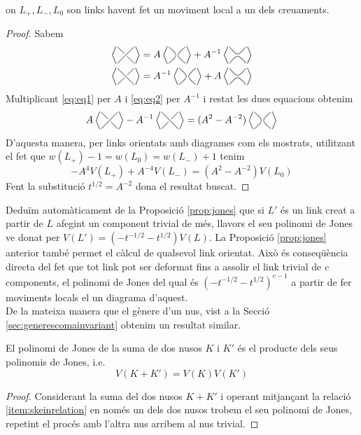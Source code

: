 on $L_{+}, L_{-}, L_{0}$ son links havent fet un moviment local a un dels creuaments.

\begin{proof}
	Sabem
	\begin{align}
		\label{eq:eq1}\left\langle\KPB\right\rangle=
		A\left\langle\KPC\right\rangle + A^{-1} \left\langle \KPD \right\rangle\\
		\label{eq:eq2}\left\langle\KPI\right\rangle=
		A^{-1}\left\langle\KPC\right\rangle + A \left\langle \KPD \right\rangle
	\end{align}
	Multiplicant \ref{eq:eq1} per $A$ i \ref{eq:eq2} per $A^{-1}$ i restat les dues equacions obtenim $$A\left\langle\KPB\right\rangle-A^{-1}\left\langle\KPI\right\rangle=(A^2-A^{-2})\left\langle\KPC\right\rangle$$
	D'aquesta manera, per links orientats amb diagrames com els mostrats, utilitzant el fet que $w(L_{+})-1=w(L_{0})=w(L_{-})+1$ tenim $$-A^4V(L_{+})+A^{-4}V(L_{-})=(A^{2}-A^{-2})V(L_{0})$$ Fent la substitució $t^{1/2}=A^{-2}$ dona el resultat buscat.
\end{proof}

Deduïm automàticament de la Proposició \ref{prop:jones} que si $L'$ és un link creat a partir de $L$ afegint un component trivial de més, llavors el seu polinomi de Jones ve donat per $V(L')=(-t^{-1/2}-t^{1/2})V(L)$. La Proposició \ref{prop:jones} anterior també permet el càlcul de qualsevol link orientat. Això és conseqüència directa del fet que tot link pot ser deformat fins a assolir el link trivial de $c$ components, el polinomi de Jones del qual és $(-t^{-1/2}-t^{1/2})^{c-1}$ a partir de fer moviments locals el un diagrama d'aquest.\\

De la mateixa manera que el gènere d'un nus, vist a la Secció \ref{sec:generescomainvariant} obtenim un resultat similar.\\

\begin{proposition}
	El polinomi de Jones de la suma de dos nusos $K$ i $K'$ és el producte dels seus polinomis de Jones, i.e. $$V(K+K')=V(K)V(K')$$
\end{proposition}

\begin{proof}
	Considerant la suma del dos nusos $K+K'$ i operant mitjançant la relació \ref{item:skeinrelation} en només un dels dos nusos trobem el seu polinomi de Jones, repetint el procés amb l'altra nus arribem al nus trivial.
\end{proof}



